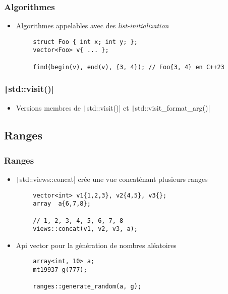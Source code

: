 \documentclass[C++.tex]{subfiles}
\begin{document}
\begin{frame}[fragile]
	\frametitle{Algorithmes}
	\begin{itemize}
		\item Algorithmes appelables avec des \textit{list-initialization}
	\end{itemize}

	\begin{verbatim}
		struct Foo { int x; int y; };
		vector<Foo> v{ ... };

		find(begin(v), end(v), {3, 4}); // Foo{3, 4} en C++23
	\end{verbatim}

\end{frame}


\begin{frame}[fragile]
	\frametitle{\texttt|std::visit()|}
	\begin{itemize}
		\item Versions membres de \texttt|std::visit()| et \texttt|std::visit_format_arg()|
	\end{itemize}

\end{frame}

\subsection*{Ranges}
\begin{frame}[fragile]
	\frametitle{Ranges}
	\begin{itemize}
		\item \texttt|std::views::concat| crée une vue concaténant plusieurs ranges
	\end{itemize}

	\begin{verbatim}
		vector<int> v1{1,2,3}, v2{4,5}, v3{};
		array  a{6,7,8};

		// 1, 2, 3, 4, 5, 6, 7, 8
		views::concat(v1, v2, v3, a);
	\end{verbatim}

	\begin{itemize}
		\item Api \og{}vector\fg{} pour la génération de nombres aléatoires
	\end{itemize}

	\begin{verbatim}
		array<int, 10> a;
		mt19937 g(777);

		ranges::generate_random(a, g);
	\end{verbatim}

\end{frame}
\end{document}
